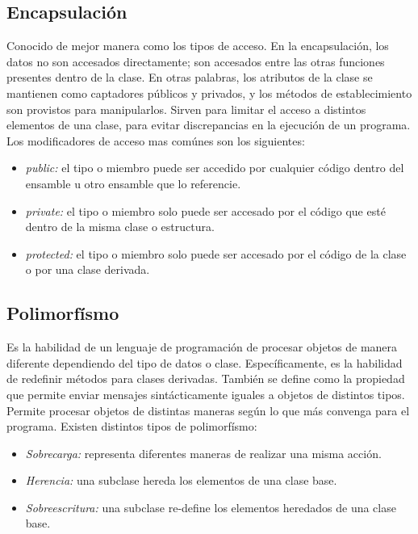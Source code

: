 \documentclass[letterpaper, 12pt]{article}
\begin{document}
\begin{justify}
        \subsection{Encapsulación}
        Conocido de mejor manera como los tipos de acceso. En la encapsulación, los datos no son accesados directamente; son accesados entre las otras funciones presentes dentro de la clase. 
        En otras palabras, los atributos de la clase se mantienen como captadores públicos y privados, y los métodos de establecimiento son provistos para manipularlos.
        Sirven para limitar el acceso a distintos elementos de una clase, para evitar discrepancias en la ejecución de un programa.
        Los modificadores de acceso mas comúnes son los siguientes:
        \begin{itemize}
            \item \emph{public: }el tipo o miembro puede ser accedido por cualquier código dentro del ensamble u otro ensamble que lo referencie. 
            \item \emph{private: }el tipo o miembro solo puede ser accesado por el código que esté dentro de la misma clase o estructura.
            \item \emph{protected: }el tipo o miembro solo puede ser accesado por el código de la clase o por una clase derivada.
        \end{itemize}
        \subsection{Polimorfísmo}
        Es la habilidad de un lenguaje de programación de procesar objetos de manera diferente dependiendo del tipo de datos o clase. Específicamente, es la habilidad de redefinir métodos 
        para clases derivadas. También se define como la propiedad que permite enviar mensajes sintácticamente iguales a objetos de distintos tipos. 
        Permite procesar objetos de distintas maneras según lo que más convenga para el programa.
        Existen distintos tipos de polimorfísmo:
        \begin{itemize}
            \item \emph{Sobrecarga: }representa diferentes maneras de realizar una misma acción.
            \item \emph{Herencia: }una subclase hereda los elementos de una clase base.
            \item \emph{Sobreescritura: }una subclase re-define los elementos heredados de una clase base.
        \end{itemize}
        \end{justify}
\end{document}
